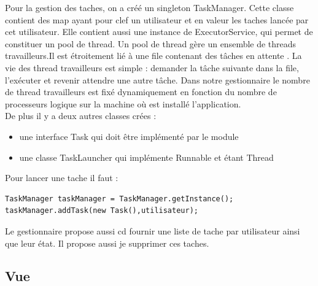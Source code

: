 Pour la gestion des taches, on a créé un singleton TaskManager. Cette classe contient des map ayant pour clef un utilisateur et en valeur les taches lancée par cet utilisateur. Elle contient aussi une instance de ExecutorService, qui permet de constituer un pool de thread. Un pool de thread gère un ensemble de threads travailleurs.Il est étroitement lié à une file contenant des tâches en attente . La vie des thread travailleurs est simple : demander la tâche suivante dans la file, l'exécuter et revenir attendre une autre tâche. Dans notre gestionnaire le nombre de thread travailleurs est fixé dynamiquement en fonction du nombre de processeurs logique sur la machine où est installé l'application.\\
De plus il y a deux autres classes crées : \\
\begin{itemize}
\item une interface Task qui doit être implémenté par le module
\item une classe TaskLauncher qui implémente Runnable et étant Thread
\end{itemize}
Pour lancer une tache il faut :
\begin{verbatim}
TaskManager taskManager = TaskManager.getInstance();
taskManager.addTask(new Task(),utilisateur);
\end{verbatim}
Le gestionnaire propose aussi cd fournir une liste de tache par utilisateur ainsi que leur état. Il propose aussi je supprimer ces taches.\\

\subsection{Vue}

